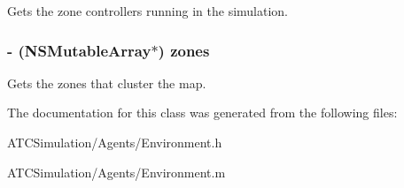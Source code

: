 \label{interface_environment_a3d62231f10bae1d800466e43bfcc2da7}
\-Gets the zone controllers running in the simulation. \hypertarget{interface_environment_a781ba0e2e19e6cca48eb70e0efac06eb}{
\subsubsection[{zones}]{\setlength{\rightskip}{0pt plus 5cm}-\/ (\-N\-S\-Mutable\-Array$\ast$) zones}}
\label{interface_environment_a781ba0e2e19e6cca48eb70e0efac06eb}
\-Gets the zones that cluster the map. 

\-The documentation for this class was generated from the following files\-:\begin{DoxyCompactItemize}
\item 
\-A\-T\-C\-Simulation/\-Agents/\-Environment.\-h\item 
\-A\-T\-C\-Simulation/\-Agents/\-Environment.\-m\end{DoxyCompactItemize}
